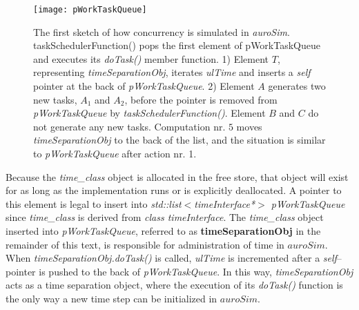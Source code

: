 \begin{figure}[htb!p]
	\centering
	\texttt{[image: pWorkTaskQueue]}
	\caption[A schematic model of time propagation in \emph{auroSim}]{
			The first sketch of how concurrency is simulated in \emph{auroSim}.
			taskSchedulerFunction() pops the first element of pWorkTaskQueue and executes its \emph{doTask()} member function.
			1) Element $T$, representing \emph{timeSeparationObj}, iterates \emph{ulTime} and inserts a \emph{self} pointer at the back of \emph{pWorkTaskQueue}.
			2) Element $A$ generates two new tasks, $A_1$ and $A_2$, before the pointer is removed from \emph{pWorkTaskQueue} by \emph{taskSchedulerFunction()}.
 			Element $B$ and $C$ do not generate any new tasks.
			Computation nr. $5$ moves  \emph{timeSeparationObj} to the back of the list, and the situation is similar to \emph{pWorkTaskQueue} after action nr. 1.
			}
	\label{figTimePropagationbypWorkTaskQueue}
\end{figure}

	Because the \emph{time\_class} object is allocated in the free store, that object will exist for as long as the implementation runs or is explicitly deallocated. 
	A pointer to this element is legal to insert into \emph{std::list$<$timeInterface*$>$ pWorkTaskQueue} since \emph{time\_class} is derived from \emph{class timeInterface}.
	The \emph{time\_class} object inserted into \emph{pWorkTaskQueue}, referred to as {\bf timeSeparationObj} in the remainder of this text, is responsible for administration of time in $auroSim$. 
	When \emph{timeSeparationObj.doTask()} is called, \emph{ulTime} is incremented after a \emph{self}--pointer is pushed to the back of \emph{pWorkTaskQueue}\cite{FDP_report}.
	In this way, \emph{timeSeparationObj} acts as a time separation object, where the execution of its \emph{doTask()} function is the only way a new time step can be initialized in $auroSim$.

